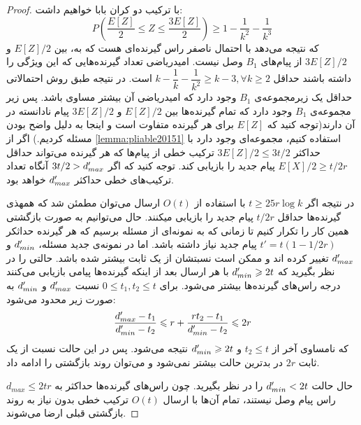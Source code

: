 \begin{proof}
			با ترکیب دو کران بابا خواهیم داشت:
			\begin{equation}
				P(\dfrac{E[Z]}{2} \leq Z \leq \dfrac{3E[Z]}{2}) \geq 1 - \dfrac{1}{k^2} - \dfrac{1}{k^3}
			\end{equation}
			که نتیجه می‌دهد با احتمال ناصفر راس گیرنده‌ای هست که به، بین
			$E[Z]/2$
			و
			$3E[Z]/2$
			از پیام‌های
			$B_1$
			وصل نیست. امیدریاضی تعداد گیرنده‌هایی که این ویژگی را داشته باشند حداقل
			$k - \dfrac{1}{k} - \dfrac{1}{k^2} \geq k - 3, \forall k \geq 2$
			است. در نتیجه طبق روش احتمالاتی حداقل یک زیرمجموعه‌ی
			$B_1$
			وجود دارد که امیدریاضی آن بیشتر مساوی باشد. پس زیر مجموعه‌ی
			$B_1$
			وجود دارد که تمام گیرنده‌ها بین
			$E[Z] / 2$
			و
			$3E[Z]/2$
			پیام نادانسته در آن دارند(توجه کنید که
			$E[Z]$
			برای هر گیرنده متفاوت است و اینجا به دلیل واضح بودن مسئله 
			 کردیم.) اگر از 
			 \autoref{lemma:pliable20151}
			 استفاده کنیم، مجموعه‌ای وجود دارد با حداکثر
			 $3E[Z]/2 \leq 3t/2$
			 ترکیب خطی از پیام‌ها که هر گیرنده می‌تواند حداقل
			 $E[X]/2 \geq t/2r$
			 پیام جدید را بازیابی کند. توجه کنید که اگر
			 $3t/2 > d_{max}'$
			 آنگاه تعداد ترکیب‌های خطی حداکثر
			 $d_{max}'$
			 خواهد بود.
			 
			 در نتیجه اگر
			 $t \geq 25 r \log k$
			 با استفاده از
			 $O(t)$
			 ارسال می‌توان مطمئن شد که همهذی گیرنده‌ها حداقل
			 $t/2r$
			 پیام جدید را بازیابی میکنند. حال می‌توانیم به صورت بازگشتی همین کار را تکرار کنیم تا زمانی که به نمونه‌ای از مسئله برسیم که هر گیرنده حداثکر
			 $t' = t(1 - 1/2r)$
			 پیام جدید نیاز داشته باشد. اما در نمونه‌ی جدید مسئله،
			 $d_{min}'$
			 و
			 $d_{max}'$
			 تغییر کرده اند و ممکن است نسبتشان از یک ثابت بیشتر شده باشد. حالتی را در نظر بگیرید که
			 $d_{min}' \geqslant 2t$
			 با هر ارسال بعد از اینکه گیرنده‌ها پیامی بازیابی می‌کنند درجه راس‌های گیرنده‌ها بیشتر می‌شود. برای
			 $0 \leq t_1, t_2 \leq t$
			 نسبت
			 $d_{max}'$
			 و
			 $d_{min}'$
			 به صورت زیر محدود می‌شود:
			 \begin{equation}
			 	\dfrac{d_{max}' - t_1}{d_{min}' - t_2} \leqslant r + \dfrac{rt_2 - t_1}{d_{min}' - t_2} \leqslant 2r
			 \end{equation}
			 که نامساوی آخر از 
			 $t_2 \leq t$
			 و
			 $d_{min}' \geqslant 2t$
			 نتیجه می‌شود. پس در این حالت نسبت از یک ثابت
			 $2r$
			 در بدترین حالت بیشتر نمی‌شود و می‌توان روند بازگشتی را ادامه داد.
			 
			 حال حالت
			 $d_{min}' < 2t$
			 را در نظر بگیرید. چون راس‌های گیرنده‌ها حداکثر به
			 $d_{max} \leq 2tr$
			 راس پیام وصل نیستند، تمام آن‌ها با ارسال
			 $O(t)$
			 ترکیب خطی بدون نیاز به روند بازگشتی قبلی ارضا می‌شوند.
			 

\end{proof}
